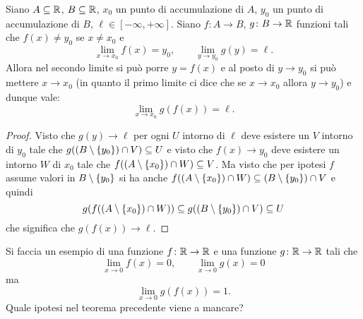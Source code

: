 \begin{theorem}
\label{th:limite_composta}
Siano $A\subseteq {\mathbb R}$, $B\subseteq {\mathbb R}$,
$x_0$ un punto di accumulazione di $A$,
$y_0$ un punto di accumulazione di $B$,
$\ell\in [-\infty,+\infty]$.
Siano $f\colon A \to B$, $g\colon B\to {\mathbb R}$
funzioni tali che $f(x)\neq y_0$ se $x\neq x_0$ e 
\[
  \lim_{x\to x_0} f(x) = y_0,
\qquad
  \lim_{y\to y_0} g(y) = \ell.
\]
Allora nel secondo limite si può porre $y=f(x)$ e al posto di $y\to y_0$ 
si può mettere $x\to x_0$ (in quanto il primo limite ci dice che se $x\to x_0$ 
allora $y\to y_0$) e dunque vale:
\[
 \lim_{x\to x_0} g(f(x)) = \ell.
\]
\end{theorem}
%
\begin{proof}
Visto che $g(y)\to \ell$
per ogni $U$ intorno di $\ell$ deve esistere un $V$ intorno di $y_0$
tale che $g((B\setminus{\left\{ y_0 \right\}})\cap V) \subseteq U$
e visto  che $f(x)\to y_0$ deve esistere un intorno $W$ di $x_0$
tale che $f((A\setminus{\left\{ x_0 \right\}})\cap W) \subseteq V$.
Ma visto che per ipotesi $f$ assume valori in $B\setminus{\left\{ y_0 \right\}}$
si ha anche $f((A\setminus{\left\{ x_0 \right\}})\cap W)\subseteq (B\setminus{\left\{ y_0 \right\}}) \cap V$
e quindi
\[
  g(f((A\setminus{\left\{ x_0 \right\}})\cap W)) \subseteq g((B\setminus {\left\{ y_0 \right\}}) \cap V)
  \subseteq U
\]
che significa che $g(f(x)) \to \ell$.
\end{proof}

\begin{exercise}
  Si faccia un esempio di una funzione $f\colon{\mathbb R}\to {\mathbb R}$ 
  e una funzione $g\colon{\mathbb R}\to {\mathbb R}$ tali che 
  \[
  \lim_{x\to 0} f(x) = 0, \qquad 
  \lim_{x\to 0} g(x) = 0
  \]
  ma
  \[
  \lim_{x\to 0} g(f(x)) = 1.
  \]
  Quale ipotesi nel teorema precedente viene a mancare?
\end{exercise}


